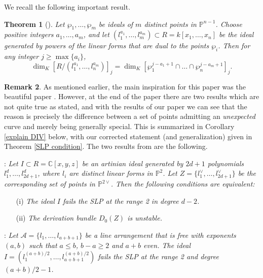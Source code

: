 \documentclass[12pt]{amsart}
\numberwithin{equation}{section}
\newtheorem{theorem}{Theorem}[section]
\theoremstyle{definition}
\newtheorem{remark}[theorem]{Remark}
\begin{document}
We recall the following important result.

\begin{theorem}[\cite{EI}]   
       \label{thm:inverse-system}
Let $\wp_1, \dots, \wp_m$ be ideals of  $m$ distinct points in $\mathbb P^{n-1}$.   Choose positive integers $a_1,\dots,a_m$, and let $(l_1^{a_1} ,\dots,l_m^{a_m}) \subset R = k[x_1,\dots,x_n]$ be the ideal generated by powers of the  linear forms that are dual to the points  $\wp_i$. 
Then for any integer $j \geq \max\{ a_i\}$,
\[
\dim_K \left [R/ (l_1^{a_1}, \dots, l_n^{a_m} )  \right ]_j =
\dim_K \left [ \wp_1^{j-a_1 +1} \cap \dots \cap \wp_n^{j-a_m+1} \right ]_j .
\]
\end{theorem}

\begin{remark}
As mentioned earlier, the main inspiration for this paper was the beautiful paper \cite{DIV}. However, at the end of the paper there are two results which  are not quite true as stated, and with the results of our paper we can see that the reason is precisely the difference between a set of points admitting an {\em unexpected} curve and merely being generally special. This is summarized in Corollary \ref{explain DIV} below, with our corrected statement (and generalization) given in Theorem \ref{SLP condition}.  The two results from \cite{DIV} are the following.\medskip 

\noindent
\cite[Proposition 7.2]{DIV}: \emph{
Let $I \subset R = \mathbb C[x,y,z]$ be an artinian ideal generated by $2d+1$ polynomials $l_1^d,\dots,l_{2d+1}^d$, where $l_i$ are distinct linear forms in $\mathbb P^2$.  Let $Z = \{ l_1^\vee,\dots,l_{2d+1}^\vee \}$ be the corresponding set of points in $\mathbb P^{2\vee}$.  Then the following conditions are equivalent:}

\begin{itemize}

\item[(i)]  \emph{ The ideal $I$ fails the SLP at the range 2 in degree $d-2$.}

\item[(ii)]  \emph{The derivation bundle $D_0(Z)$ is unstable.}

\end{itemize}
\medskip

\noindent
\cite[Proposition 7.4]{DIV}: \emph{
Let $\mathcal A = \{ l_1,\dots, l_{a+b+1} \}$ be a line arrangement that is free with exponents $(a,b)$ such that $a \leq b$, $b-a \geq 2$ and $a+b$ even.  The ideal $I = (l_1^{(a+b)/2},\dots, l_{a+b+1}^{(a+b)/2} )$ fails the SLP at the range 2 and degree $(a+b)/2 -1$.}
\end{remark}
\end{document}
